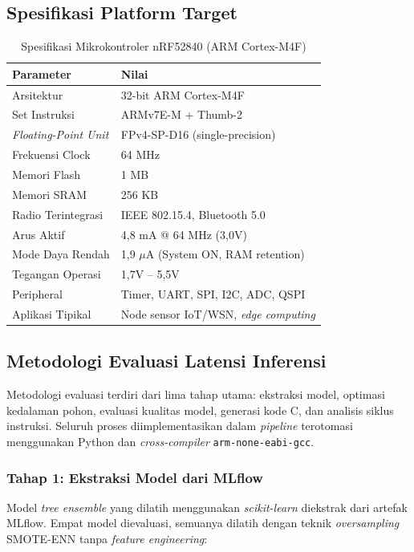 \subsection{Spesifikasi Platform Target}

\begin{table}[htbp]
\centering
\caption{Spesifikasi Mikrokontroler nRF52840 (ARM Cortex-M4F)}
\label{tab:nrf52840_specs}
\begin{tabular}{ll}
\hline
\textbf{Parameter} & \textbf{Nilai} \\
\hline
Arsitektur & 32-bit ARM Cortex-M4F \\
Set Instruksi & ARMv7E-M + Thumb-2 \\
\textit{Floating-Point Unit} & FPv4-SP-D16 (single-precision) \\
Frekuensi Clock & 64 MHz \\
Memori Flash & 1 MB \\
Memori SRAM & 256 KB \\
Radio Terintegrasi & IEEE 802.15.4, Bluetooth 5.0 \\
Arus Aktif & 4,8 mA @ 64 MHz (3,0V) \\
Mode Daya Rendah & 1,9 $\mu$A (System ON, RAM retention) \\
Tegangan Operasi & 1,7V -- 5,5V \\
Peripheral & Timer, UART, SPI, I2C, ADC, QSPI \\
Aplikasi Tipikal & Node sensor IoT/WSN, \textit{edge computing} \\
\hline
\end{tabular}
\end{table}

\subsection{Metodologi Evaluasi Latensi Inferensi}

Metodologi evaluasi terdiri dari lima tahap utama: ekstraksi model, optimasi kedalaman pohon, evaluasi kualitas model, generasi kode C, dan analisis siklus instruksi. Seluruh proses diimplementasikan dalam \textit{pipeline} terotomasi menggunakan Python dan \textit{cross-compiler} \texttt{arm-none-eabi-gcc}.

\subsubsection{Tahap 1: Ekstraksi Model dari MLflow}

Model \textit{tree ensemble} yang dilatih menggunakan \textit{scikit-learn} diekstrak dari artefak MLflow. Empat model dievaluasi, semuanya dilatih dengan teknik \textit{oversampling} SMOTE-ENN tanpa \textit{feature engineering}:

